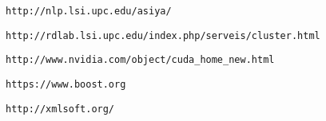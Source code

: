 \documentclass[11pt,a4paper]{article}
\begin{document}
\newpage
\begin{thebibliography}{10}
\texttt{http://nlp.lsi.upc.edu/asiya/}

\texttt{http://rdlab.lsi.upc.edu/index.php/serveis/cluster.html}

\texttt{http://www.nvidia.com/object/cuda\_home\_new.html}

\texttt{https://www.boost.org}

\texttt{http://xmlsoft.org/}
\end{thebibliography}
\end{document}
